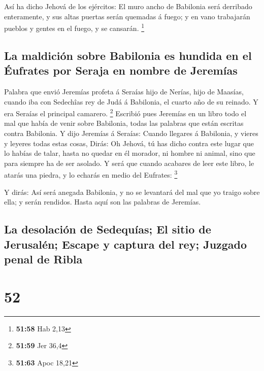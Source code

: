  Así ha dicho Jehová de los ejércitos: El muro ancho de
Babilonia será derribado enteramente, y sus altas puertas serán quemadas
á fuego; y en vano trabajarán pueblos y gentes en el fuego, y se
cansarán. \footnote{\textbf{51:58} Hab 2,13}

\hypertarget{la-maldiciuxf3n-sobre-babilonia-es-hundida-en-el-uxe9ufrates-por-seraja-en-nombre-de-jeremuxedas}{%
\subsection{La maldición sobre Babilonia es hundida en el Éufrates por
Seraja en nombre de
Jeremías}\label{la-maldiciuxf3n-sobre-babilonia-es-hundida-en-el-uxe9ufrates-por-seraja-en-nombre-de-jeremuxedas}}

 Palabra que envió Jeremías profeta á Seraías hijo de
Nerías, hijo de Maasías, cuando iba con Sedechîas rey de Judá á
Babilonia, el cuarto año de su reinado. Y era Seraías el principal
camarero. \footnote{\textbf{51:59} Jer 36,4}  Escribió pues
Jeremías en un libro todo el mal que había de venir sobre Babilonia,
todas las palabras que están escritas contra Babilonia.  Y
dijo Jeremías á Seraías: Cuando llegares á Babilonia, y vieres y leyeres
todas estas cosas,  Dirás: Oh Jehová, tú has dicho contra
este lugar que lo habías de talar, hasta no quedar en él morador, ni
hombre ni animal, sino que para siempre ha de ser asolado. 
Y será que cuando acabares de leer este libro, le atarás una piedra, y
lo echarás en medio del Eufrates: \footnote{\textbf{51:63} Apoc 18,21}

 Y dirás: Así será anegada Babilonia, y no se levantará del
mal que yo traigo sobre ella; y serán rendidos. Hasta aquí son las
palabras de Jeremías.

\hypertarget{la-desolaciuxf3n-de-sedequuxedas-el-sitio-de-jerusaluxe9n-escape-y-captura-del-rey-juzgado-penal-de-ribla}{%
\subsection{La desolación de Sedequías; El sitio de Jerusalén; Escape y
captura del rey; Juzgado penal de
Ribla}\label{la-desolaciuxf3n-de-sedequuxedas-el-sitio-de-jerusaluxe9n-escape-y-captura-del-rey-juzgado-penal-de-ribla}}

\hypertarget{section-51}{%
\section{52}\label{section-51}}

